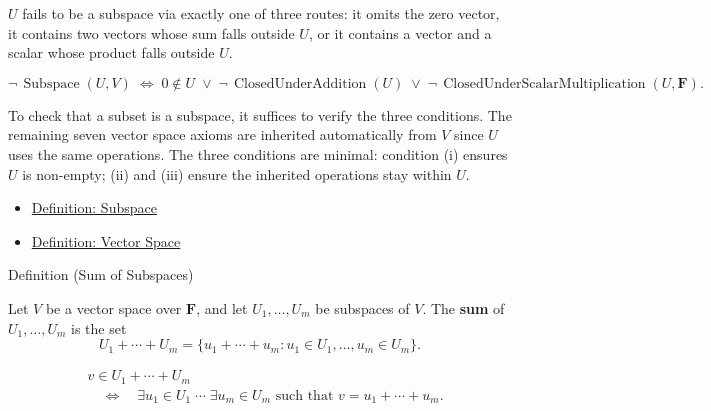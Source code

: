 \begin{remark*}
$U$ fails to be a subspace via exactly one of three routes: it omits the zero
vector, it contains two vectors whose sum falls outside $U$, or it contains a
vector and a scalar whose product falls outside $U$.
\end{remark*}

\begin{remark*}
\[
\neg\,\operatorname{Subspace}(U,V)
\;\Longleftrightarrow\;
0 \notin U
\;\vee\;
\neg\,\operatorname{ClosedUnderAddition}(U)
\;\vee\;
\neg\,\operatorname{ClosedUnderScalarMultiplication}(U,\mathbf{F}).
\]
\end{remark*}

\begin{remark*}[Interpretation]
To check that a subset is a subspace, it suffices to verify the three
conditions. The remaining seven vector space axioms are inherited automatically
from $V$ since $U$ uses the same operations. The three conditions are minimal:
condition (i) ensures $U$ is non-empty; (ii) and (iii) ensure the inherited
operations stay within $U$.
\end{remark*}

\begin{dependencies}
\begin{itemize}
  \item \hyperref[def:subspace]{Definition: Subspace}
  \item \hyperref[def:vector-space]{Definition: Vector Space}
\end{itemize}
\end{dependencies}


\begin{definitionbox}{Definition (Sum of Subspaces)}
\begin{definition}
\label{def:sum-of-subspaces}
Let $V$ be a vector space over $\mathbf{F}$, and let
$U_1,\dots,U_m$ be subspaces of $V$.
The \textbf{sum} of $U_1,\dots,U_m$ is the set
\[
U_1+\cdots+U_m
=
\{u_1+\cdots+u_m : u_1 \in U_1,\dots,u_m \in U_m\}.
\]
\end{definition}
\end{definitionbox}

\begin{remark*}
\[
\begin{aligned}
&v \in U_1+\cdots+U_m \\
&\quad\Longleftrightarrow\quad
\exists u_1 \in U_1 \;\cdots\; \exists u_m \in U_m
\text{ such that } v=u_1+\cdots+u_m.
\end{aligned}
\]
\end{remark*}

